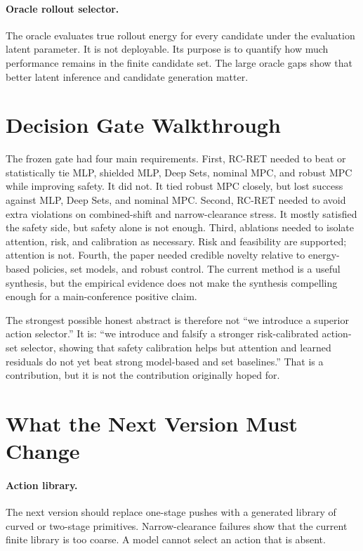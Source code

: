 \documentclass{article}
\newcommand{\method}{RC-RET}
\begin{document}
\paragraph{Oracle rollout selector.}
The oracle evaluates true rollout energy for every candidate under the evaluation latent parameter.  It is not deployable.  Its purpose is to quantify how much performance remains in the finite candidate set.  The large oracle gaps show that better latent inference and candidate generation matter.

\section{Decision Gate Walkthrough}

The frozen gate had four main requirements.  First, \method{} needed to beat or statistically tie MLP, shielded MLP, Deep Sets, nominal MPC, and robust MPC while improving safety.  It did not.  It tied robust MPC closely, but lost success against MLP, Deep Sets, and nominal MPC.  Second, \method{} needed to avoid extra violations on combined-shift and narrow-clearance stress.  It mostly satisfied the safety side, but safety alone is not enough.  Third, ablations needed to isolate attention, risk, and calibration as necessary.  Risk and feasibility are supported; attention is not.  Fourth, the paper needed credible novelty relative to energy-based policies, set models, and robust control.  The current method is a useful synthesis, but the empirical evidence does not make the synthesis compelling enough for a main-conference positive claim.

The strongest possible honest abstract is therefore not ``we introduce a superior action selector.''  It is: ``we introduce and falsify a stronger risk-calibrated action-set selector, showing that safety calibration helps but attention and learned residuals do not yet beat strong model-based and set baselines.''  That is a contribution, but it is not the contribution originally hoped for.

\section{What the Next Version Must Change}

\paragraph{Action library.}
The next version should replace one-stage pushes with a generated library of curved or two-stage primitives.  Narrow-clearance failures show that the current finite library is too coarse.  A model cannot select an action that is absent.
\end{document}
